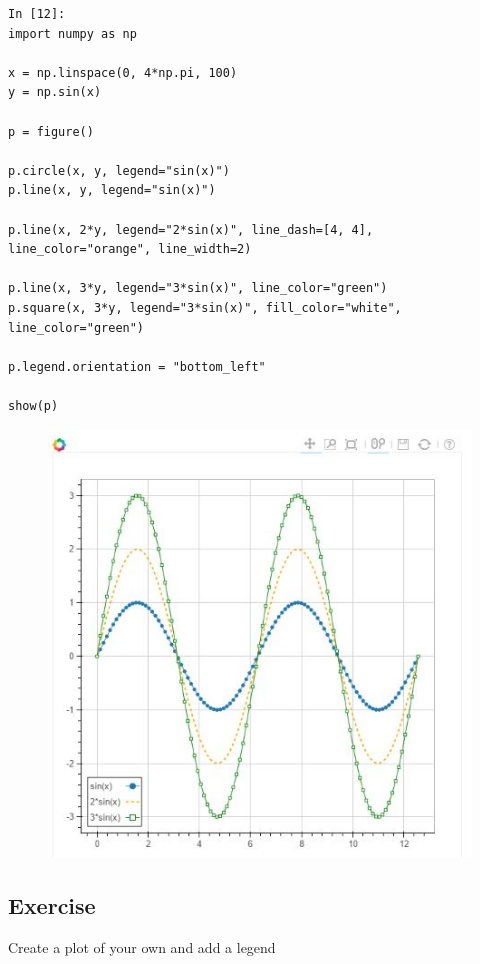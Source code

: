 \documentclass[a4paper,12pt]{article}
\begin{document}
\begin{framed}
\begin{verbatim}
In [12]:
import numpy as np

x = np.linspace(0, 4*np.pi, 100)
y = np.sin(x)

p = figure()

p.circle(x, y, legend="sin(x)")
p.line(x, y, legend="sin(x)")

p.line(x, 2*y, legend="2*sin(x)", line_dash=[4, 4], line_color="orange", line_width=2)

p.line(x, 3*y, legend="3*sin(x)", line_color="green")
p.square(x, 3*y, legend="3*sin(x)", fill_color="white", line_color="green")

p.legend.orientation = "bottom_left"

show(p)
\end{verbatim}
\end{framed}	
\begin{figure}[h!]
\centering
\includegraphics[width=0.7\linewidth]{images/04-legends-01}
\end{figure}

\subsection*{Exercise}
Create a plot of your own and add a legend
\end{document}
